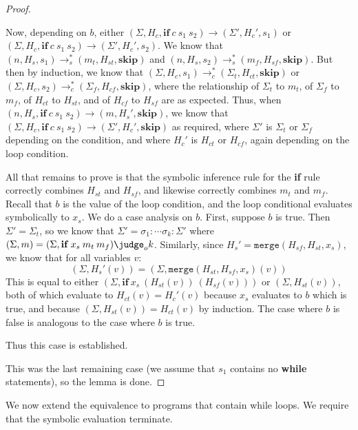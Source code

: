 \begin{proof}
\begin{itemize}
    Now, depending on $b$,
    either
    $(\Sigma, H_c, \mathbf{if}\:c\:s_1\:s_2) \to (\Sigma', H_c', s_1)$
    or
    $(\Sigma, H_c, \mathbf{if}\:c\:s_1\:s_2) \to (\Sigma', H_c', s_2)$.
    We know that
    $(n, H_s, s_1) \to_s^{*} (m_t, H_{st}, \mathbf{skip})$
    and
    $(n, H_s, s_2) \to_s^{*} (m_f, H_{sf}, \mathbf{skip})$.
    But then by induction, we know that
    $(\Sigma, H_c, s_1) \to_c^{*} (\Sigma_t, H_{ct}, \mathbf{skip})$
    or
    $(\Sigma, H_c, s_2) \to_c^{*} (\Sigma_f, H_{cf}, \mathbf{skip})$,
    where the relationship of $\Sigma_t$ to $m_t$, of $\Sigma_f$ to
    $m_f$, of $H_{ct}$ to $H_{st}$, and of $H_{cf}$ to $H_{sf}$ are
    as expected.
    Thus, when
    $(n, H_s, \mathbf{if}\:c\:s_1\:s_2) \to (m, H_s', \mathbf{skip})$,
    we know that
    $(\Sigma, H_c, \mathbf{if}\:c\:s_1\:s_2) \to (\Sigma', H_c', \mathbf{skip})$
    as required, where $\Sigma'$ is $\Sigma_t$ or $\Sigma_f$ depending
    on the condition, and where $H_c'$ is $H_{ct}$ or $H_{cf}$, again
    depending on the loop condition.

    All that remains to prove is that the symbolic inference rule for
    the \textbf{if} rule correctly combines $H_{st}$ and $H_{sf}$, and
    likewise correctly combines $m_t$ and $m_f$.
    Recall that $b$ is the value of the loop condition, and the loop
    conditional evaluates symbolically to $x_s$.
    We do a case analysis on $b$.
    First, suppose $b$ is true.  Then $\Sigma' = \Sigma_t$, so we know
    that $\Sigma' = \sigma_1:\dotsb\sigma_k:\Sigma'$ where
    $(\Sigma, m) = (\Sigma, \mathbf{if}\:x_s\:m_t\:m_f) \judge_o k$.
    Similarly, since $H_s' = \mathtt{merge}(H_{sf}, H_{st}, x_s)$,
    we know that for all variables $v$:
    $$(\Sigma, H_s'(v)) = (\Sigma, \mathtt{merge}(H_{st}, H_{sf}, x_s)(v))$$
    This is equal to either $(\Sigma, \mathbf{if}\:x_s\:(H_{st}(v))\:(H_{sf}(v)))$
    or $(\Sigma, H_{st}(v))$, both of which evaluate to $H_{ct}(v) = H_c'(v)$
    because $x_s$ evaluates to $b$ which is true, and because
    $(\Sigma, H_{st}(v)) = H_{ct}(v)$ by induction.
    The case where $b$ is false is analogous to the case where $b$ is
    true.

    Thus this case is established.
  \end{itemize}

  This was the last remaining case (we assume that $s_1$ contains no
  \textbf{while} statements), so the lemma is done.
\end{proof}

We now extend the equivalence to programs that contain while loops.
We require that the symbolic evaluation terminate.

